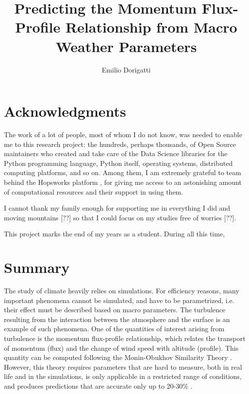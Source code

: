 \documentclass[a4paper]{book}
\begin{document}
\title{Predicting the Momentum Flux-Profile Relationship from  Macro Weather Parameters}
\author{Emilio Dorigatti}


\maketitle
\restoregeometry


\section*{Acknowledgments}
The work of a lot of people, most of whom I do not know, was needed to enable me to this research project: the hundreds, perhaps thousands, of Open Source maintainers who created and take care of the Data Science libraries for the Python programming language, 
Python itself, operating systems, distributed computing platforms, and so on. Among them, I am extremely grateful to team behind the Hopsworks platform \citep{hops}, for giving me access to an astonishing amount of computational resources and their support in using them.

I cannot thank my family enough for supporting me in everything I did and moving mountains [??] so that I could focus on my studies free of worries [??].

This project marks the end of my years as a student.  During all this time,

\newpage

\section*{Summary}
The study of climate heavily relies on simulations. For efficiency reasons, many important phenomena cannot be simulated, and have to be parametrized, i.e. their effect must be described based on macro parameters. The turbulence resulting from the interaction between the atmosphere and the surface is an example of such phenomena. One of the quantities of interest arising from turbulence is the momentum flux-profile relationship, which relates the transport of momentum (flux) and the change of wind speed with altitude (profile). This quantity can be computed following the Monin-Obukhov Similarity Theory \citep{mostayyyy}. However, this theory requires parameters that are hard to measure, both in real life and in the simulations, is only applicable in a restricted range of conditions, and produces predictions that are accurate only up to 20-30\% \citep{50years}.
\end{document}
